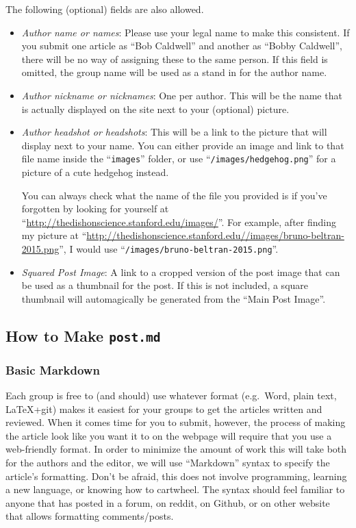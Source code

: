 \documentclass[paper=a4, fontsize=11pt]{scrartcl}
\numberwithin{equation}{section}        %
\numberwithin{figure}{section}            %
\numberwithin{table}{section}                %
\newcommand{\dishurlplain}[1]{http://thedishonscience.stanford.edu/#1}
\newcommand{\dishurl}[1]{\url{\dishurlplain{#1}}}
\begin{document}
\noindent{}The following (optional) fields are also allowed.
\begin{itemize}
    \item \emph{Author name or names}: Please use your legal name to make this consistent. If
        you submit one article as ``Bob Caldwell'' and another as ``Bobby
        Caldwell'', there will be no way of assigning these to the same person.
        If this field is omitted, the group name will be used as a stand in for
        the author name.
    \item \emph{Author nickname or nicknames}: One per author. This will be the name that is
        actually displayed on the site next to your (optional) picture.
    \item \emph{Author headshot or headshots}: This will be a link to the picture that will
        display next to your name. You can either provide an image and link to
        that file name inside the ``\texttt{images}'' folder, or use
        ``\texttt{/images/hedgehog.png}'' for a picture of a cute hedgehog instead.

        You can always check what the name of the file you provided is if you've
        forgotten by looking for yourself at ``\dishurl{images/}''.
        For example, after finding my picture at
        ``\dishurl{/images/bruno-beltran-2015.png}'', I would use
        ``\texttt{/images/bruno-beltran-2015.png}''.
    \item \emph{Squared Post Image}: A link to a cropped version of the post image that
        can be used as a thumbnail for the post. If this is not included, a
        square thumbnail will automagically be generated from the ``Main Post Image''.
\end{itemize}


\subsection{How to Make \texttt{\textbf{post.md}}}

\subsubsection{Basic Markdown}

Each group is free to (and should) use whatever format (e.g.\ Word, plain text,
LaTeX+git) makes it easiest for your groups to get the articles written and
reviewed. When it comes time for you to submit, however, the process of making
the article look like you want it to on the webpage will require that you use a web-friendly
format. In order to minimize the amount of work this will take both for the
authors and the editor, we will use ``Markdown'' syntax to specify the article's
formatting. Don't be afraid, this does not involve programming, learning a new
language, or knowing how to cartwheel. The syntax should feel familiar to anyone
that has posted in a forum, on reddit, on Github, or on other website that allows
formatting comments/posts.
\end{document}
